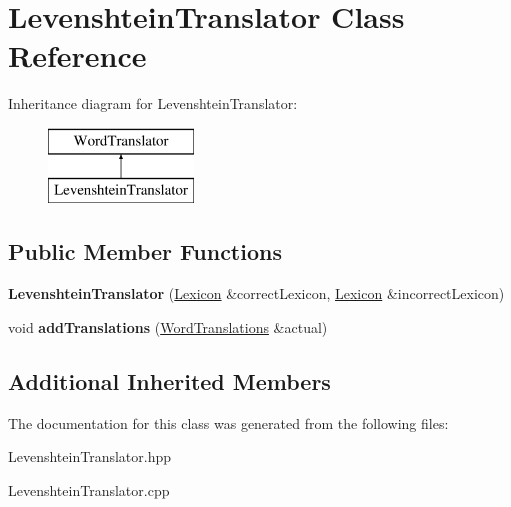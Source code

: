 \hypertarget{classLevenshteinTranslator}{}\section{Levenshtein\+Translator Class Reference}
\label{classLevenshteinTranslator}
Inheritance diagram for Levenshtein\+Translator\+:\begin{figure}[H]
\begin{center}
\leavevmode
\includegraphics[height=2.000000cm]{classLevenshteinTranslator}
\end{center}
\end{figure}
\subsection*{Public Member Functions}
\begin{DoxyCompactItemize}
\item 
\mbox{\label{classLevenshteinTranslator_a549cbb265018570510b836e2cc5c8128}} 
{\bfseries Levenshtein\+Translator} (\hyperlink{classLexicon}{Lexicon} \&correct\+Lexicon, \hyperlink{classLexicon}{Lexicon} \&incorrect\+Lexicon)
\item 
\mbox{\label{classLevenshteinTranslator_af78505539527d0678ca35d9cb63910d4}} 
void {\bfseries add\+Translations} (\hyperlink{classWordTranslations}{Word\+Translations} \&actual)
\end{DoxyCompactItemize}
\subsection*{Additional Inherited Members}


The documentation for this class was generated from the following files\+:\begin{DoxyCompactItemize}
\item 
Levenshtein\+Translator.\+hpp\item 
Levenshtein\+Translator.\+cpp\end{DoxyCompactItemize}
